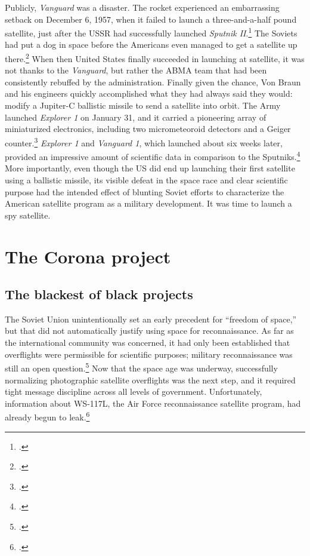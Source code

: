 \documentclass{memoir}
\begin{document}
Publicly, \emph{Vanguard} was a disaster. The rocket experienced an embarrassing setback on December 6, 1957, when it failed to launch a three-and-a-half pound satellite, just after the USSR had successfully launched \emph{Sputnik II}.\footcite[p.~119]{killian_sputnik_1977} The Soviets had put a dog in space before the Americans even managed to get a satellite up there.\footcite[Her name was Laika.]{george_sad_2018} When then United States finally succeeded in launching at satellite, it was not thanks to the \emph{Vanguard}, but rather the ABMA team that had been consistently rebuffed by the administration. Finally given the chance, Von Braun and his engineers quickly accomplished what they had always said they would: modify a Jupiter-C ballistic missile to send a satellite into orbit. The Army launched \emph{Explorer 1} on January 31, and it carried a pioneering array of miniaturized electronics, including two micrometeoroid detectors and a Geiger counter.\footcite[p.~168]{mcdougall_heavens_1985} \emph{Explorer 1} and \emph{Vanguard 1}, which launched about six weeks later, provided an impressive amount of scientific data in comparison to the Sputniks.\footcite[p.~168]{mcdougall_heavens_1985} More importantly, even though the US did end up launching their first satellite using a ballistic missile, its visible defeat in the space race and clear scientific purpose had the intended effect of blunting Soviet efforts to characterize the American satellite program as a military development. It was time to launch a spy satellite.

\section{The Corona project}
\subsection{The blackest of black projects}
The Soviet Union unintentionally set an early precedent for ``freedom of space,'' but that did not automatically justify using space for reconnaissance. As far as the international community was concerned, it had only been established that overflights were permissible for scientific purposes; military reconnaissance was still an open question.\footcite[p.~47-48]{peebles_corona_1997} Now that the space age was underway, successfully normalizing photographic satellite overflights was the next step, and it required tight message discipline across all levels of government. Unfortunately, information about WS-117L, the Air Force reconnaissance satellite program, had already begun to leak.\footcite[p.~96]{lindgren_trust_2000}
\end{document}

